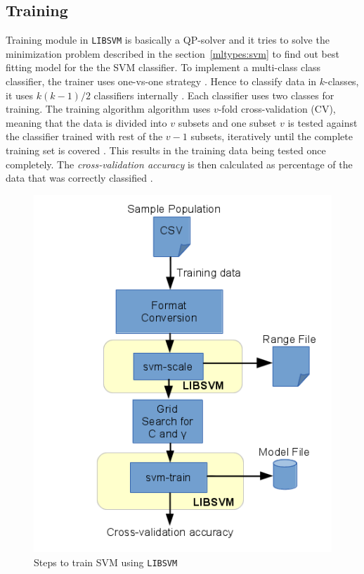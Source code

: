 \subsection{Training}

Training module in \texttt{LIBSVM} is basically a QP-solver and it tries to solve the minimization problem described in the section~\ref{mltypes:svm} to find out best fitting model for the  the SVM classifier. To implement a multi-class class classifier, the trainer uses one-vs-one strategy \cite{Knerr1990}. Hence to classify data in $k$-classes, it uses $k(k-1)/2$ classifiers internally \cite{Chang2011}. Each classifier uses two classes for training. The training algorithm algorithm uses $v$-fold cross-validation (CV), meaning that the data is divided into $v$ subsets and one subset $v$ is tested against the classifier trained with rest of the $v-1$ subsets, iteratively until the complete training set is covered \cite{Hsu2003}. This results in the training data being tested once completely. The \emph{cross-validation accuracy} is then calculated as percentage of the data that was correctly classified \cite{Hsu2003}.

\label{sec:impl:tr}
\begin{figure}[h]
  \begin{center}
    \captionsetup{justification=centering}
    \includegraphics[scale=0.75]{figures/libsvmtrain.png}
    \caption{Steps to train SVM using \texttt{LIBSVM}}
    \label{fig:libsvmtrain}
  \end{center}
\end{figure}

